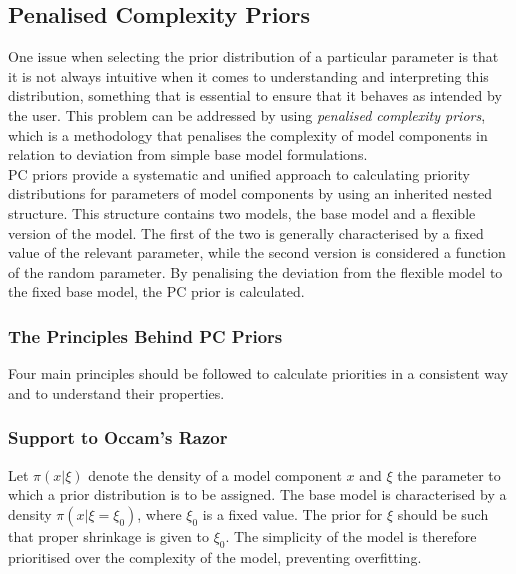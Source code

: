 \subsection{Penalised Complexity Priors}
One issue when selecting the prior distribution of a particular parameter is that it is not always intuitive when it comes to understanding and interpreting this distribution, something that is essential to ensure that it behaves as intended by the user. This problem can be addressed by using \textit{penalised complexity priors}, which is a methodology that penalises the complexity of model components in relation to deviation from simple base model formulations.\\
PC priors provide a systematic and unified approach to calculating priority distributions for parameters of model components by using an inherited nested structure. This structure contains two models, the base model and a flexible version of the model. The first of the two is generally characterised by a fixed value of the relevant parameter, while the second version is considered a function of the random parameter. By penalising the deviation from the flexible model to the fixed base model, the PC prior is calculated.
\subsubsection{The Principles Behind PC Priors}
Four main principles should be followed to calculate priorities in a consistent way and to understand their properties.
\subsubsection*{Support to Occam's Razor} 
Let $\pi\left(x|\xi\right)$ denote the density of a model component $x$ and $\xi$ the parameter to which a prior distribution is to be assigned. The base model is characterised by a density $\pi\left(x|\xi=\xi_0\right)$, where $\xi_0$ is a fixed value. The prior for $\xi$ should be such that proper shrinkage is given to $\xi_0$. The simplicity of the model is therefore prioritised over the complexity of the model, preventing overfitting.
